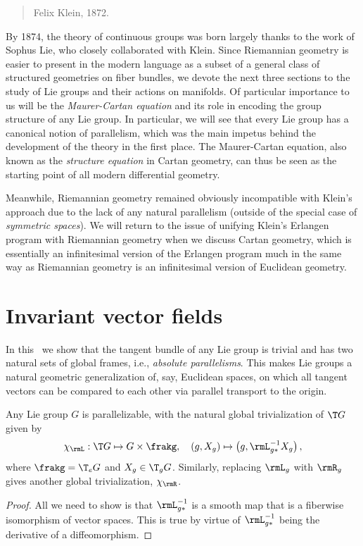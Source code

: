 \begin{hrem*}
\begin{quote}
        \hfill Felix Klein, 1872.
    \end{quote}
    By 1874, the theory of continuous groups was born largely thanks to the work of Sophus Lie, who closely collaborated with Klein. Since Riemannian geometry is easier to present in the modern language as a subset of a general class of structured geometries on fiber bundles, we devote the next three sections to the study of Lie groups and their actions on manifolds. Of particular importance to us will be the \emph{Maurer-Cartan equation} and its role in encoding the group structure of any Lie group. In particular, we will see that every Lie group has a canonical notion of parallelism, which was the main impetus behind the development of the theory in the first place. The Maurer-Cartan equation, also known as the \emph{structure equation} in Cartan geometry, can thus be seen as the starting point of all modern differential geometry.
    
    Meanwhile, Riemannian geometry remained obviously incompatible with Klein's approach due to the lack of any natural parallelism (outside of the special case of \emph{symmetric spaces}). We will return to the issue of unifying Klein's Erlangen program with Riemannian geometry when we discuss Cartan geometry, which is essentially an infinitesimal version of the Erlangen program much in the same way as Riemannian geometry is an infinitesimal version of Euclidean geometry.
\end{hrem*}









\section{Invariant vector fields}

In this \sect\ we show that the tangent bundle of any Lie group is trivial and has two natural sets of global frames, i.e., \emph{absolute parallelisms}. This makes Lie groups a natural geometric generalization of, say, Euclidean spaces, on which all tangent vectors can be compared to each other via parallel transport to the origin.

\begin{prop}
    Any Lie group $G$ is parallelizable, with the natural global trivialization of $\T G$ given by
    \[\chi_\rmL:\T G\mapsto G\times \frakg,\quad (g,X_g)\mapsto \left(g, \rmL_{g\ast }^{-1}X_g\right),\]
    where $\frakg=\T_e G$ and $X_g\in \T_gG$. Similarly, replacing $\rmL_g$ with $\rmR_g$ gives another global trivialization, $\chi_\rmR$.
\end{prop}
\begin{proof}
    All we need to show is that $\rmL_{g\ast}^{-1}$ is a smooth map that is a fiberwise isomorphism of vector spaces. This is true by virtue of $\rmL_{g\ast}^{-1}$ being the derivative of a diffeomorphism.
\end{proof}

